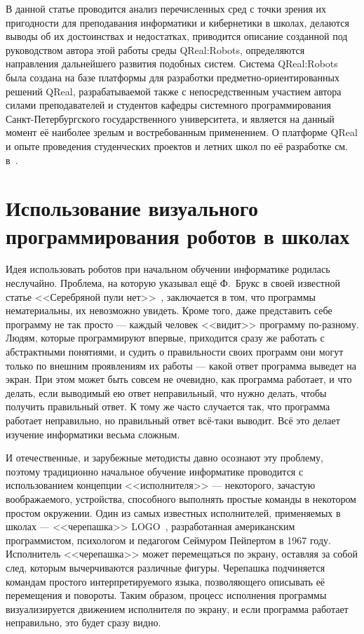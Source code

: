 \documentclass[a4paper]{article}
\begin{document}
В данной  статье проводится анализ перечисленных сред с точки зрения их пригодности для преподавания информатики и кибернетики в школах, делаются выводы об их достоинствах и недостатках, приводится описание созданной под руководством автора этой работы среды QReal:Robots, определяются направления дальнейшего развития подобных систем. Система QReal:Robots была создана на базе платформы для разработки предметно-ориентированных решений QReal, разрабатываемой также с непосредственным участием автора силами преподавателей и студентов кафедры системного программирования Санкт-Петербургского государственного университета, и является на данный момент её наиболее зрелым и востребованным применением. О платформе QReal и опыте проведения студенческих проектов и летних школ по её разработке см. в~\cite{bryksin}.

\section{Использование визуального программирования роботов в школах}
Идея использовать роботов при начальном обучении информатике родилась неслучайно. Проблема, на которую указывал ещё Ф.~Брукс в своей известной статье <<Серебряной пули нет>>~\cite{mythicalManMonth}, заключается в том, что программы нематериальны, их невозможно увидеть. Кроме того, даже представить себе программу не так просто --- каждый человек <<видит>> программу по-разному. Людям, которые программируют впервые, приходится сразу же работать с абстрактными понятиями, и судить о правильности своих программ они могут только по внешним проявлениям их работы --- какой ответ программа выведет на экран. При этом может быть совсем не очевидно, как программа работает, и что делать, если выводимый ею ответ неправильный, что нужно делать, чтобы получить правильный ответ. К тому же часто случается так, что программа работает неправильно, но правильный ответ всё-таки выводит. Всё это делает изучение информатики весьма сложным.

И отечественные, и зарубежные методисты давно осознают эту проблему, поэтому традиционно начальное обучение информатике проводится с использованием концепции <<исполнителя>> --- некоторого, зачастую воображаемого, устройства, способного выполнять простые команды в некотором простом окружении. Один из самых известных исполнителей, применяемых в школах --- <<черепашка>> LOGO~\cite{logo}, разработанная американским программистом, психологом и педагогом Сеймуром Пейпертом в 1967 году. Исполнитель <<черепашка>> может перемещаться по экрану, оставляя за собой след, которым вычерчиваются различные фигуры. Черепашка подчиняется командам простого интерпретируемого языка, позволяющего описывать её перемещения и повороты. Таким образом, процесс исполнения программы визуализируется движением исполнителя по экрану, и если программа работает неправильно, это будет сразу видно. 
\end{document}
